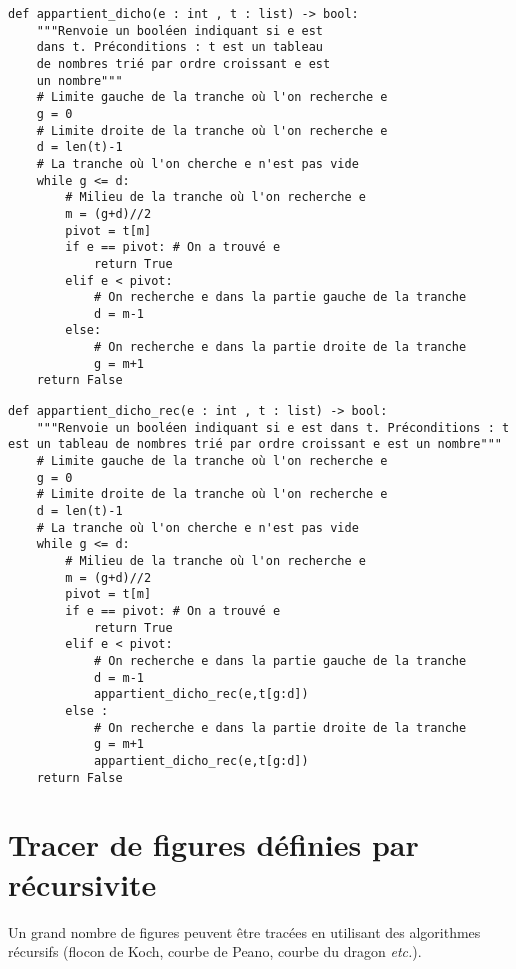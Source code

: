 \noindent\begin{minipage}[c]{.49\linewidth}
\begin{lstlisting}
def appartient_dicho(e : int , t : list) -> bool:
    """Renvoie un booléen indiquant si e est 
    dans t. Préconditions : t est un tableau 
    de nombres trié par ordre croissant e est 
    un nombre"""
    # Limite gauche de la tranche où l'on recherche e
    g = 0 
    # Limite droite de la tranche où l'on recherche e
    d = len(t)-1 
    # La tranche où l'on cherche e n'est pas vide
    while g <= d: 
        # Milieu de la tranche où l'on recherche e
        m = (g+d)//2 
        pivot = t[m]
        if e == pivot: # On a trouvé e
            return True
        elif e < pivot:
            # On recherche e dans la partie gauche de la tranche
            d = m-1 
        else:
            # On recherche e dans la partie droite de la tranche
            g = m+1 
    return False
\end{lstlisting}
\end{minipage} \hfill
\begin{minipage}[c]{.49\linewidth}
\begin{lstlisting}
def appartient_dicho_rec(e : int , t : list) -> bool:
    """Renvoie un booléen indiquant si e est dans t. Préconditions : t est un tableau de nombres trié par ordre croissant e est un nombre"""
    # Limite gauche de la tranche où l'on recherche e
    g = 0 
    # Limite droite de la tranche où l'on recherche e
    d = len(t)-1 
    # La tranche où l'on cherche e n'est pas vide
    while g <= d:
        # Milieu de la tranche où l'on recherche e 
        m = (g+d)//2 
        pivot = t[m]
        if e == pivot: # On a trouvé e
            return True
        elif e < pivot:
            # On recherche e dans la partie gauche de la tranche
            d = m-1 
            appartient_dicho_rec(e,t[g:d])
        else :
            # On recherche e dans la partie droite de la tranche
            g = m+1
            appartient_dicho_rec(e,t[g:d])
    return False
\end{lstlisting}
\end{minipage}

\section{Tracer de figures définies par récursivite}
Un grand nombre de figures peuvent être tracées en utilisant des algorithmes récursifs (flocon de Koch, courbe de Peano, courbe du dragon \textit{etc.}).


